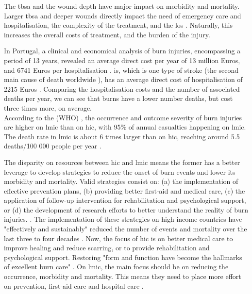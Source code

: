 The \gls{tbsa} and the wound depth have major impact on morbidity and mortality. Larger \gls{tbsa} and deeper wounds directly impact the need of emergency care and hospitalisation, the complexity of the treatment, and the \gls{los} \cite{Santos_2016_burden_burns_portugal, Bartosch_2013_mortality_lengthofstay}. Naturally, this increases the overall costs of treatment, and the burden of the injury. 

In Portugal, a clinical and economical analysis of burn injuries, encompassing a period of 13 years, revealed an average direct cost per year of 13 million Euros, and 6741 Euros per hospitalisation \cite{Santos_2016_burden_burns_portugal}. \gls{is}, which is one type of stroke (the second main cause of death worldwide \cite{GHE2016_xls}), has an average direct cost of hospitalisation of 2215 Euros \cite{Santos_2017_atrial_fibrillation_stroke}. Comparing the hospitalisation costs and the number of associated deaths per year, we can see that burns have a lower number deaths, but cost three times more, on average. \\

According to the \citeauthor{who2008_plan_burn_prevention_care} (WHO) \cite{who2011_sucess_stories}, the occurrence and outcome severity of burn injuries are higher on \gls{lmic} than on \gls{hic}, with 95\% of annual casualties happening on \gls{lmic}. The death rate in \gls{lmic} is about 6 times larger than on \gls{hic}, reaching around 5.5 deaths/100 000 people per year \cite{who2011_sucess_stories}. 

The disparity on resources between \gls{hic} and \gls{lmic} means the former has a better leverage to develop strategies to reduce the onset of burn events and lower its morbidity and mortality. Valid strategies consist on: (a) the implementation of effective prevention plans, (b) providing better first-aid and medical care, (c) the application of follow-up intervention for rehabilitation and psychological support, or (d) the development of research efforts to better understand the reality of burn injuries. \cite{who2008_plan_burn_prevention_care, who2011_sucess_stories}. The implementation of these strategies on high income countries have "effectively and sustainably" reduced the number of events and mortality over the last three to four decades \cite{who2011_sucess_stories}. 
Now, the focus of \gls{hic} is on better medical care to improve healing and reduce scarring, or to provide rehabilitation and psychological support. Restoring "form and function have become the hallmarks of excellent burn care" \cite{isbi_guidelines_burn_care}. On \gls{lmic}, the main focus should be on reducing the occurrence, morbidity and mortality. This means they need to place more effort on prevention, first-aid care and hospital care \cite{who2008_plan_burn_prevention_care, who2011_sucess_stories}.

